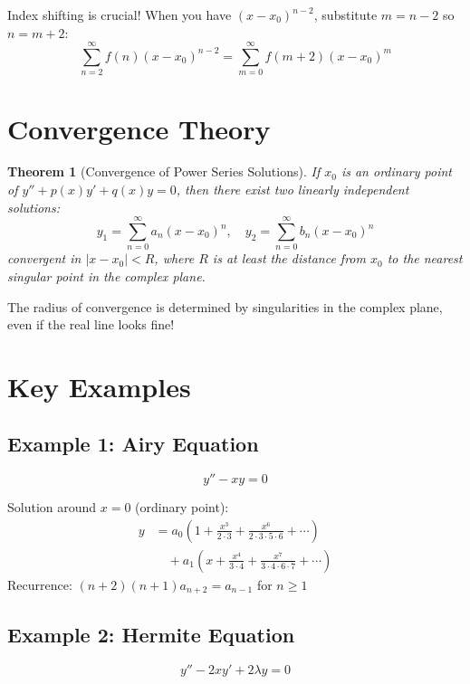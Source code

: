 \documentclass[12pt]{article}
\newtheorem{theorem}{Theorem}
\begin{document}
\begin{warning}
Index shifting is crucial! When you have $(x-x_{0})^{n-2}$, substitute $m = n-2$ so $n = m+2$:
$$\sum_{n=2}^{\infty} f(n)(x-x_{0})^{n-2} = \sum_{m=0}^{\infty} f(m+2)(x-x_{0})^{m}$$
\end{warning}

\section{Convergence Theory}

\begin{theorem}[Convergence of Power Series Solutions]
If $x_{0}$ is an ordinary point of $y'' + p(x)y' + q(x)y = 0$, then there exist two linearly independent solutions:
$$y_{1} = \sum_{n=0}^{\infty} a_{n}(x-x_{0})^{n}, \quad y_{2} = \sum_{n=0}^{\infty} b_{n}(x-x_{0})^{n}$$
convergent in $|x-x_{0}| < R$, where $R$ is at least the distance from $x_{0}$ to the nearest singular point in the complex plane.
\end{theorem}

\begin{insight}
The radius of convergence is determined by singularities in the complex plane, even if the real line looks fine!
\end{insight}

\section{Key Examples}

\subsection{Example 1: Airy Equation}
$$y'' - xy = 0$$
\begin{series}
Solution around $x = 0$ (ordinary point):
\begin{align}
y &= a_{0}\left(1 + \frac{x^{3}}{2\cdot 3} + \frac{x^{6}}{2\cdot 3 \cdot 5 \cdot 6} + \cdots\right) \\
&\quad + a_{1}\left(x + \frac{x^{4}}{3\cdot 4} + \frac{x^{7}}{3\cdot 4 \cdot 6 \cdot 7} + \cdots\right)
\end{align}
Recurrence: $(n+2)(n+1)a_{n+2} = a_{n-1}$ for $n \geq 1$
\end{series}

\subsection{Example 2: Hermite Equation}
$$y'' - 2xy' + 2\lambda y = 0$$
\end{document}
